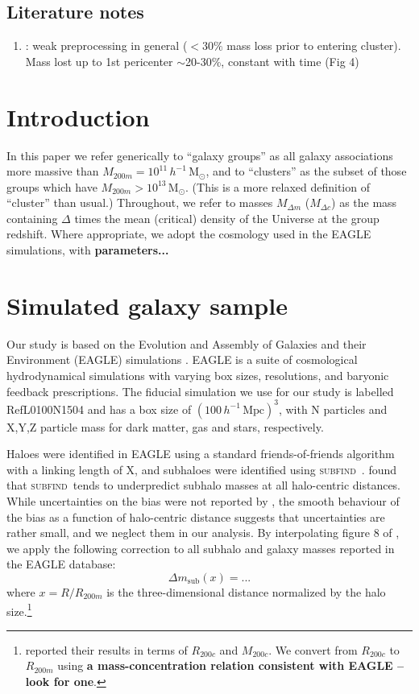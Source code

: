 \documentclass[usenatbib,fleqn]{mnras}
\newcommand{\Msun}{\mathrm{M}_\odot}
\newcommand{\hMsun}{h^{-1}\,\Msun}
\newcommand{\hMpc}{h^{-1}\,\mathrm{Mpc}}
\newcommand{\subfind}{\textsc{subfind}}
\begin{document}
\subsection{Literature notes}

\begin{enumerate}
  \item \citet{rhee17}: weak preprocessing in general ($<30\%$ mass loss prior to entering cluster). Mass lost up to 1st pericenter $\sim$20-30\%, constant with time (Fig 4)
\end{enumerate}



\section{Introduction}

In this paper we refer generically to ``galaxy groups'' as all galaxy associations more massive than $M_{200m}=10^{11}\,\hMsun$, and to ``clusters'' as the subset of those groups which have $M_{200m}>10^{13}\,\Msun$. (This is a more relaxed definition of ``cluster'' than usual.) Throughout, we refer to masses $M_{\Delta m}$ ($M_{\Delta c}$) as the mass containing $\Delta$ times the mean (critical) density of the Universe at the group redshift. Where appropriate, we adopt the cosmology used in the EAGLE simulations,  with \textbf{parameters...}


\section{Simulated galaxy sample}

Our study is based on the Evolution and Assembly of Galaxies and their Environment (EAGLE) simulations \citep{schaye15,crain15}. EAGLE is a suite of cosmological hydrodynamical simulations with varying box sizes, resolutions, and baryonic feedback prescriptions. The fiducial simulation we use for our study is labelled RefL0100N1504 and has a box size of $(100\,\hMpc)^3$, with N particles and X,Y,Z particle mass for dark matter, gas and stars, respectively.

Haloes were identified in EAGLE using a standard friends-of-friends algorithm with a linking length of X, and subhaloes were identified using \subfind\ \citep{springel01_cluster}. \cite{knebe11} found that \subfind\ tends to underpredict subhalo masses at all halo-centric distances. While uncertainties on the bias were not reported by \cite{knebe11}, the smooth behaviour of the bias as a function of halo-centric distance suggests that uncertainties are rather small, and we neglect them in our analysis. By interpolating figure 8 of \cite{knebe11}, we apply the following correction to all subhalo and galaxy masses reported in the EAGLE database:
\begin{equation}\label{eq:subfind_correction}
  \Delta m_\mathrm{sub}(x) = ...
\end{equation}
where $x=R/R_{200m}$ is the three-dimensional distance normalized by the halo size.\footnote{\cite{knebe11} reported their results in terms of $R_{200c}$ and $M_{200c}$. We convert from $R_{200c}$ to $R_{200m}$ using \textbf{a mass-concentration relation consistent with EAGLE -- look for one}.}
\end{document}
